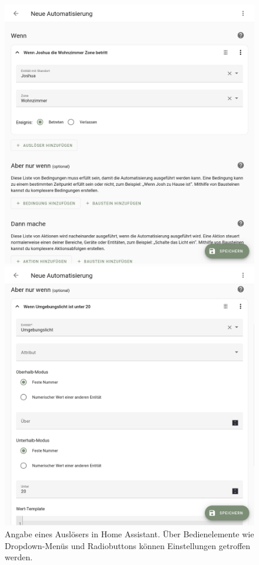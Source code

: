 \begin{figure}[!ht]
  \begin{minipage}[t]{\hascwidth}
    \includegraphics[width=\linewidth]{assets/hassio-automation-trigger.png}
    \caption[Angabe eines Auslösers in Home Assistant]{Angabe eines Auslösers in Home Assistant. Über Bedienelemente wie Dropdown-Menüs und Radiobuttons können Einstellungen getroffen werden.}
    \label{figure:hassio-automation-trigger}
  \end{minipage}
  \hfill
  \begin{minipage}[t]{\hascwidth}
    \includegraphics[width=\linewidth]{assets/hassio-automation-condition.png}

\end{minipage}
\end{figure}
